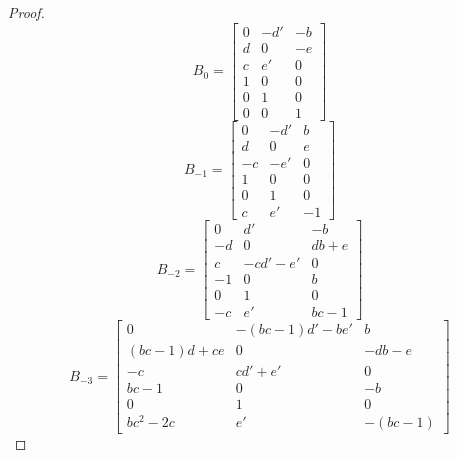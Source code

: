 \documentclass{amsart}
\numberwithin{theorem}{section}
\begin{document}
\begin{proof}
    \[B_0=\left[\begin{array}{ccc} 0 & -d' & -b \\ d & 0 & -e\\ c & e' & 0\\ 1 & 0 & 0\\ 0 & 1 & 0\\ 0 & 0 & 1\end{array}\right]\]
    \[B_{-1}=\left[\begin{array}{ccc} 0 & -d' & b \\ d & 0 & e\\ -c & -e' & 0\\ 1 & 0 & 0\\ 0 & 1 & 0\\ c & e' & -1\end{array}\right]\]
    \[B_{-2}=\left[\begin{array}{ccc} 0 & d' & -b \\ -d & 0 & db + e\\ c & -cd' - e' & 0\\ -1 & 0 & b\\ 0 & 1 & 0\\ -c & e' & bc-1\end{array}\right]\]
      \[B_{-3}=\left[\begin{array}{ccc} 0 & -(bc-1)d' - be' & b \\ (bc-1)d + ce & 0 & -db - e\\ -c & cd' + e' & 0\\ bc-1 & 0 & -b\\ 0 & 1 & 0\\ bc^2-2c & e' & -(bc-1)\end{array}\right]\]
  \end{proof}
\end{document}
